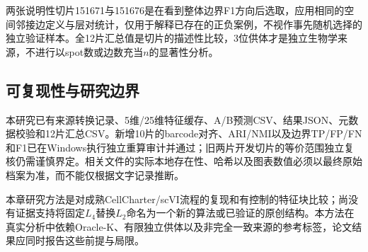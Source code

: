 \documentclass[UTF8,a4paper,12pt]{ctexart}
\begin{document}
两张说明性切片151671与151676是在看到整体边界F1方向后选取，应用相同的空间邻接边定义与层对统计，仅用于解释已存在的正负案例，不视作事先随机选择的独立验证样本。全12片汇总值是切片的描述性比较，3位供体才是独立生物学来源，不进行以spot数或边数充当$n$的显著性分析。

\subsection{可复现性与研究边界}
本研究已有来源转换记录、5维/25维特征缓存、A/B预测CSV、结果JSON、元数据校验和12片汇总CSV。新增10片的barcode对齐、ARI/NMI以及边界TP/FP/FN和F1已在Windows执行独立重算审计并通过；旧两片开发切片的等价范围独立复核仍需谨慎界定。相关文件的实际本地存在性、哈希以及图表数值必须以最终原始档案为准，而不能仅根据文字记录推断。

本章研究方法是对成熟CellCharter/scVI流程的复现和有控制的特征块比较；尚没有证据支持将固定$L_4$替换$L_2$命名为一个新的算法或已验证的原创结构。本方法在真实分析中依赖Oracle-K、有限独立供体以及非完全一致来源的参考标签，论文结果应同时报告这些前提与局限。
\end{document}

